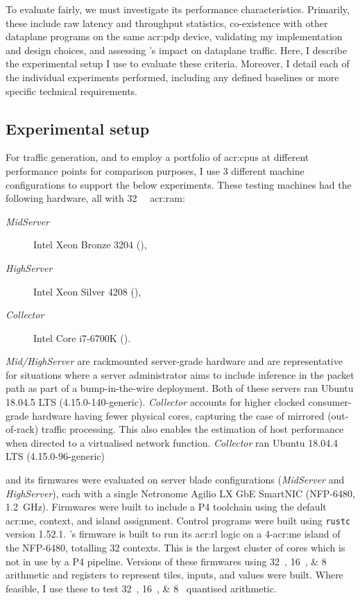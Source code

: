 To evaluate \approachshort{} fairly, we must investigate its performance characteristics.
Primarily, these include raw latency and throughput statistics, co-existence with other dataplane programs on the same \gls{acr:pdp} device, validating my implementation and design choices, and assessing \approachshort{}'s impact on dataplane traffic.
Here, I describe the experimental setup I use to evaluate these criteria.
Moreover, I detail each of the individual experiments performed, including any defined baselines or more specific technical requirements.

\subsection{Experimental setup}\label{sec:experimental-setup}
For traffic generation, and to employ a portfolio of \glspl{acr:cpu} at different performance points for comparison purposes, I use 3 different machine configurations to support the below experiments.
These testing machines had the following hardware, all with \qty{32}{\gibi\byte} \gls{acr:ram}:
\begin{description}
	\item[\emph{MidServer}] Intel Xeon Bronze 3204 (),
	\item[\emph{HighServer}] Intel Xeon Silver 4208 (),
	\item[\emph{Collector}] Intel Core i7-6700K ().
\end{description}
\emph{Mid/HighServer} are rackmounted server-grade hardware and are representative for situations where a server administrator aims to include inference in the packet path as part of a bump-in-the-wire deployment.
Both of these servers ran Ubuntu 18.04.5 LTS (4.15.0-140-generic).
\emph{Collector} accounts for higher clocked consumer-grade hardware having fewer physical cores, capturing the case of mirrored (out-of-rack) traffic processing.
This also enables the estimation of host performance when directed to a virtualised network function.
\emph{Collector} ran Ubuntu 18.04.4 LTS (4.15.0-96-generic)

\approachshort{} and its firmwares were evaluated on server blade configurations (\emph{MidServer} and \emph{HighServer}), each with a single Netronome Agilio LX GbE SmartNIC (NFP-6480, \qty{1.2}{\giga\hertz}).
Firmwares were built to include a P4 toolchain using the default \gls{acr:me}, context, and island assignment.
Control programs were built using \texttt{rustc} version 1.52.1.
\approachshort{}'s firmware is built to run its \gls{acr:rl} logic on a \num{4}-\gls{acr:me} island of the NFP-6480, totalling \num{32} contexts.
This is the largest cluster of cores which is not in use by a P4 pipeline.
Versions of these firmwares using \qtylist{32;16;8}{\bit} arithmetic and registers to represent tiles, inputs, and values were built.
Where feasible, I use these to test \qtylist{32;16;8}{\bit} quantised arithmetic.

